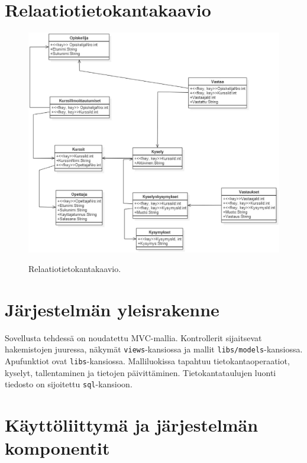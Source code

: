 \documentclass[12pt,twoside,a4paper,leqno,titlepage]{article}
\begin{document}
\clearpage
\section{Relaatiotietokantakaavio}

\begin{figure}[!h]
  \centering
  \includegraphics[width=\textwidth]{relaatiotietokantakaavio.eps}\\
  \caption{Relaatiotietokantakaavio.}
\end{figure}


\section{Järjestelmän yleisrakenne}

Sovellusta tehdessä on noudatettu MVC-mallia. Kontrollerit sijaitsevat 
hakemistojen juuressa, näkymät \verb'views'-kansiossa ja mallit 
\verb'libs/models'-kansiossa. Apufunktiot ovat \verb'libs'-kansiossa. Malliluokissa 
tapahtuu tietokantaoperaatiot, kyselyt, tallentaminen ja tietojen päivittäminen.
Tietokantataulujen luonti tiedosto on sijoitettu \verb'sql'-kansioon.

\clearpage
\section{Käyttöliittymä ja järjestelmän komponentit}
\end{document}
